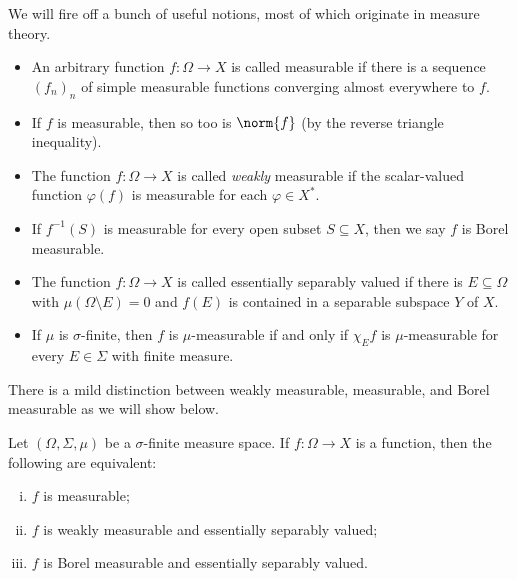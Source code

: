 \documentclass[10pt]{mypackage}
\begin{document}
We will fire off a bunch of useful notions, most of which originate in measure theory.
\begin{itemize}
  \item An arbitrary function $f\colon \Omega\rightarrow X$ is called measurable if there is a sequence $\left( f_n \right)_n$ of simple measurable functions converging almost everywhere to $f$.
  \item If $f$ is measurable, then so too is $\norm{f}$ (by the reverse triangle inequality).
  \item The function $f\colon \Omega\rightarrow X$ is called \textit{weakly} measurable if the scalar-valued function $\varphi(f)$ is measurable for each $\varphi\in X^{\ast}$.
  \item If $f^{-1}(S)$ is measurable for every open subset $S\subseteq X$, then we say $f$ is Borel measurable.
  \item The function $f\colon \Omega\rightarrow X$ is called essentially separably valued if there is $E\subseteq \Omega$ with $\mu\left( \Omega\setminus E \right) = 0$ and $f(E)$ is contained in a separable subspace $Y$ of $X$.
  \item If $\mu$ is $\sigma$-finite, then $f$ is $\mu$-measurable if and only if $\chi_E f$ is $\mu$-measurable for every $E\in \Sigma$ with finite measure.
\end{itemize}
There is a mild distinction between weakly measurable, measurable, and Borel measurable as we will show below.
\begin{proposition}
  Let $\left( \Omega,\Sigma,\mu \right)$ be a $\sigma$-finite measure space. If $f\colon \Omega\rightarrow X$ is a function, then the following are equivalent:
  \begin{enumerate}[(i)]
    \item $f$ is measurable;
    \item $f$ is weakly measurable and essentially separably valued;
    \item $f$ is Borel measurable and essentially separably valued.
  \end{enumerate}
\end{proposition}
\end{document}
